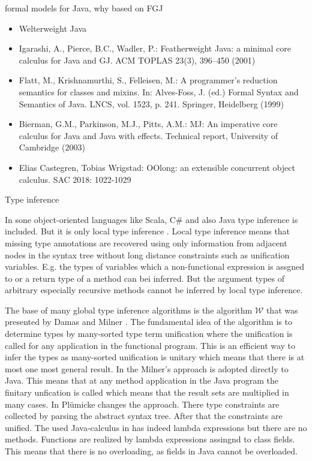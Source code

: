 
formal models for Java, why based on FGJ

\begin{itemize}
\item Welterweight Java
\item Igarashi, A., Pierce, B.C., Wadler, P.: Featherweight Java: a
  minimal core calculus for Java and GJ. ACM TOPLAS 23(3), 396–450
  (2001)
\item Flatt, M., Krishnamurthi, S., Felleisen, M.: A programmer’s
  reduction semantics for classes and mixins. In: Alves-Foss, J. (ed.)
  Formal Syntax and Semantics of Java. LNCS, vol. 1523,
  p. 241. Springer, Heidelberg (1999)
\item Bierman, G.M., Parkinson, M.J., Pitts, A.M.: MJ: An imperative
  core calculus for Java and Java with effects. Technical report,
  University of Cambridge (2003) 
\item 	Elias Castegren, Tobias Wrigstad:
OOlong: an extensible concurrent object calculus. SAC 2018: 1022-1029
\end{itemize}

Type inference

In sone object-oriented languages like Scala, C\# and also Java type inference
is included. But it is only local type inference \cite{PT98,OZZ01}. Local type
inference means that missing type annotations are recovered using only
information from adjacent nodes in the syntax tree without long distance
constraints such as unification variables. E.g. the types of variables which
a non-functional expression is assgned to or a return type of a method can bei
inferred. But the argument types of arbitrary especially recursive methods
cannot be inferred by local type inference.

The base of many global type inference algorithms is the algorithm $\mathcal{W}$
that was presented by Damas and Milner \cite{DM82}. The fundamental idea
of the algorithm is to determine types by many-sorted type term
unification \cite{Rob65,MM82} where the unification is called for any
application in the functional program. This is an efficient way to infer the types
as many-sorted unification is unitary which means that there is at most one
most general result.  In \cite{Plue07_3} the Milner's approach is adopted
directly to Java. This means that at any method application in the Java program
the finitary unfication is called which means that the result sets are multiplied in
many cases. In \cite{plue15_2} Pl\"umicke changes the approach. There 
type constraints are collected by parsing the abstract syntax tree. After that the
constraints are unified. The used Java-calculus in \cite{plue15_2} has
indeed lambda expressions but there are no methods. Functions are realized by
lambda expressions assingnd to class fields. This means that there is no
overloading, as fields in Java cannot be overloaded.



